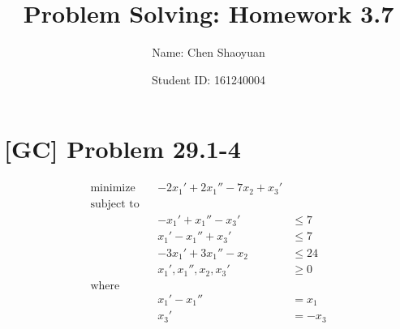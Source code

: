 \documentclass[a4paper,11pt,twocolumn]{article}
\newcommand{\homeworkno}{3.7}
\begin{document}
  \title{Problem Solving: Homework \homeworkno}
  \author{Name: Chen Shaoyuan \and Student ID: 161240004}
  \maketitle

  \section{[GC] Problem 29.1-4}
  \begin{align*}
    \text{minimize} && -2x_1'  +  2x_1''  -  7x_2  +  x_3' \\
    \text{subject to} \\
    && -x_1'  +  x_1''  -  x_3'  &\leq  7 \\
    && x_1'  -  x_1''  +  x_3'  &\leq  7 \\
    && -3x_1'  +  3x_1''  -  x_2  &\leq  24 \\
    && x_1',  x_1'',  x_2,  x_3'  &\geq  0\\
    \text{where}  \\
    && x_1' - x_1'' &= x_1\\
    && x_3' &= -x_3 
  \end{align*}
\end{document}
